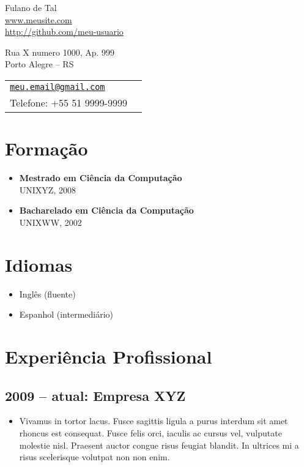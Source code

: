 \documentclass[a4paper]{article}
\makeatletter
\def\name{Fulano de Tal}
\def\endereco{Rua X numero 1000, Ap. 999}
\def\site{www.meusite.com}
\def\github{http://github.com/meu-usuario}
\def\cidade{Porto Alegre -- RS}
\def\mail{meu.email@gmail.com}
\def\telefone{+55 51 9999-9999}
\makeatother
\begin{document}
%
%
{\huge \name} \\
{\small
 \href{url}{\site} \\
\href{url}{\github}}

\vspace{0.10in}

\begin{minipage}{0.45\linewidth}
  \endereco \\
  \cidade
\end{minipage}
\begin{minipage}{0.45\linewidth}
  \begin{tabular}{ll}
    \href{mailto:\mail}{\tt \mail} \\
    Telefone: \telefone
  \end{tabular}
\end{minipage}

\vspace{1.5\baselineskip}
\hline
%
%

\section*{Formação}
\begin{itemize}
  \item \textbf{Mestrado em Ciência da Computação} \\ UNIXYZ, 2008
  \item \textbf{Bacharelado em Ciência da Computação}\\ UNIXWW, 2002
\end{itemize}

\vspace{1.5\baselineskip}
\hline
%
%
\section*{Idiomas}
\begin{itemize}
  \item Inglês (fluente)
   \item Espanhol (intermediário)
\end{itemize}

\vspace{1.5\baselineskip}
\hline
%
%
\section*{Experiência Profissional}

\subsection*{2009 -- atual: Empresa XYZ}
\begin{itemize}
\item Vivamus in tortor lacus. Fusce sagittis ligula a purus interdum sit amet rhoncus est consequat. Fusce felis orci, iaculis ac cursus vel, vulputate molestie nisl. Praesent auctor congue risus feugiat blandit. In ultrices mi a risus scelerisque volutpat non non enim.
\end{itemize}
\end{document}
